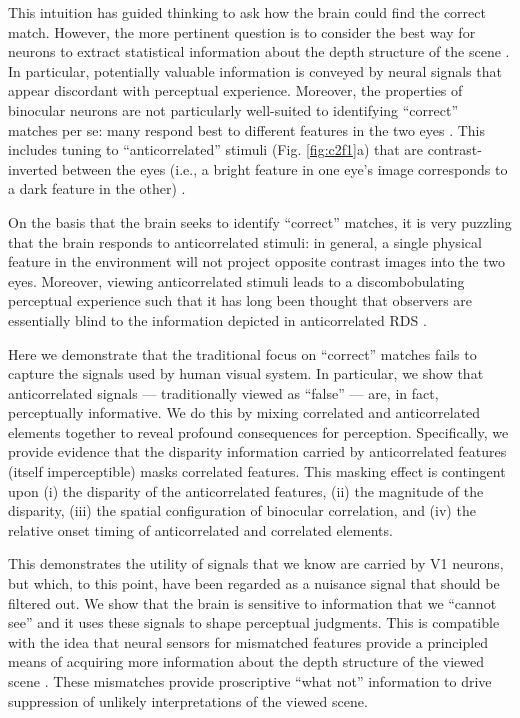 This intuition has guided thinking to ask how the brain could find the correct match. However, the more pertinent question is to consider the best way for neurons to extract statistical information about the depth structure of the scene \cite{Goncalves:2017aa}. In particular, potentially valuable information is conveyed by neural signals that appear discordant with perceptual experience. Moreover, the properties of binocular neurons are not particularly well-suited to identifying ``correct'' matches per se: many respond best to different features in the two eyes \cite{DeAngelis:1991mb,Prince:2002uq,Tsao:2003pi}. This includes tuning to ``anticorrelated'' stimuli (Fig. \ref{fig:c2f1}a) that are contrast-inverted between the eyes (i.e., a bright feature in one eye's image corresponds to a dark feature in the other) \cite{Ohzawa:1990cq,Cumming:1997ve}.

On the basis that the brain seeks to identify ``correct'' matches, it is very puzzling that the brain responds to anticorrelated stimuli: in general, a single physical feature in the environment will not project opposite contrast images into the two eyes. Moreover, viewing anticorrelated stimuli leads to a discombobulating perceptual experience such that it has long been thought that observers are essentially blind to the information depicted in anticorrelated RDS \cite{BLTJ:BLTJ3954,Cogan:1993yr,Cumming:1998ib,Read:2000kx,Hibbard2014}.

Here we demonstrate that the traditional focus on ``correct'' matches fails to capture the signals used by human visual system. In particular, we show that anticorrelated signals --- traditionally viewed as ``false'' --- are, in fact, perceptually informative. We do this by mixing correlated and anticorrelated elements together to reveal profound consequences for perception. Specifically, we provide evidence that the disparity information carried by anticorrelated features (itself imperceptible) masks correlated features. This masking effect is contingent upon (i) the disparity of the anticorrelated features, (ii) the magnitude of the disparity, (iii) the spatial configuration of binocular correlation, and (iv) the relative onset timing of anticorrelated and correlated elements.

This demonstrates the utility of signals that we know are carried by V1 neurons, but which, to this point, have been regarded as a nuisance signal that should be filtered out. We show that the brain is sensitive to information that we ``cannot see'' and it uses these signals to shape perceptual judgments. This is compatible with the idea that neural sensors for mismatched features provide a principled means of acquiring more information about the depth structure of the viewed scene \cite{Goncalves:2017aa}. These mismatches provide proscriptive ``what not'' information to drive suppression of unlikely interpretations of the viewed scene.


